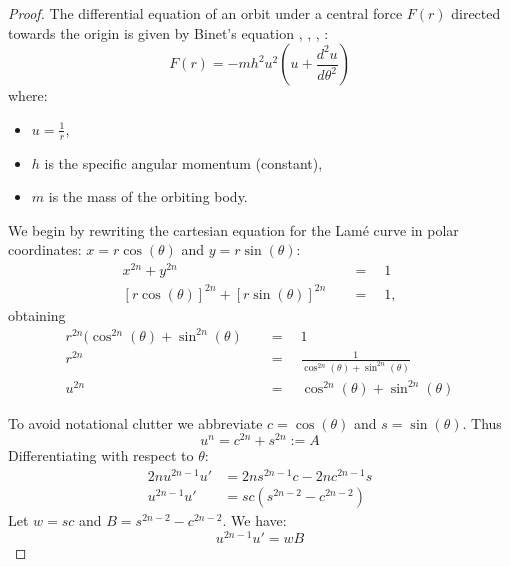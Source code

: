 \documentclass{amsart}
\theoremstyle{definition}
\begin{document}
\begin{proof}
The differential equation of an orbit under a central force $F(r)$ directed towards the origin is given by Binet's equation \cite{Wikipedia:binet_equation}, \cite[p. 87 (3.34)]{goldstein}, \cite{cline}, \cite{cooper}:
\begin{equation} \label{binet}
    F(r) = -m h^2 u^2 \left( u + \frac{d^2u}{d\theta^2} \right)
\end{equation}
where:
\begin{itemize}
    \item $u=\frac{1}{r}$,
    \item $h$ is the specific angular momentum (constant),
    \item $m$ is the mass of the orbiting body.
\end{itemize}


We begin by rewriting the cartesian equation for the Lam\'e curve in polar coordinates:
 $x = r \cos(\theta)$ and $y = r \sin(\theta)$:
\begin{align*}
x^{2n}+y^{2n} &\quad=\quad 1\\
[r \cos(\theta)]^{2n} + [r \sin(\theta)]^{2n} &\quad=\quad 1,
\end{align*}
obtaining
\begin{align*}
r^{2n} (\cos^{2n}(\theta) + \sin^{2n}(\theta) &\quad=\quad 1\\
r^{2n} &\quad=\quad \frac{1}{\cos^{2n}(\theta) + \sin^{2n}(\theta)}\\
u^{2n} &\quad=\quad \cos^{2n} (\theta) + \sin^{2n} (\theta)
\end{align*}

To avoid notational clutter we abbreviate $c=\cos(\theta)$ and $s=\sin(\theta)$. Thus
\begin{equation}
u^n=c^{2n}+s^{2n}:=A\label{A_defn}
\end{equation}
Differentiating with respect to $\theta$:
\begin{align*}
2n u^{2n-1} u' &= 2n s^{2n-1} c - 2n c^{2n-1} s \\
u^{2n-1} u' &= sc(s^{2n-2} - c^{2n-2})
\end{align*}
Let $w = sc$ and $B = s^{2n-2} - c^{2n-2}$.
We have:
\begin{equation}
u^{2n-1} u' = w B \label{eq:first_deriv}
\end{equation}


\end{proof}
\end{document}
